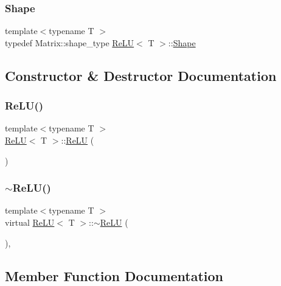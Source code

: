 \subsubsection{\texorpdfstring{Shape}{Shape}}
{\footnotesize\ttfamily template$<$typename T $>$ \\
typedef Matrix\+::shape\+\_\+type \mbox{\hyperlink{class_re_l_u}{Re\+LU}}$<$ T $>$\+::\mbox{\hyperlink{class_re_l_u_ae27e6aba0a09baa85b8ef8679db42719}{Shape}}}



\subsection{Constructor \& Destructor Documentation}
\mbox{\label{class_re_l_u_ad378d979e537b8af65513b3cb9bfe2b1}} 
\subsubsection{\texorpdfstring{ReLU()}{ReLU()}}
{\footnotesize\ttfamily template$<$typename T $>$ \\
\mbox{\hyperlink{class_re_l_u}{Re\+LU}}$<$ T $>$\+::\mbox{\hyperlink{class_re_l_u}{Re\+LU}} (\begin{DoxyParamCaption}{ }\end{DoxyParamCaption})}

\mbox{\label{class_re_l_u_a6694b0386daea4398ad932f92382e206}} 
\subsubsection{\texorpdfstring{$\sim$ReLU()}{~ReLU()}}
{\footnotesize\ttfamily template$<$typename T $>$ \\
virtual \mbox{\hyperlink{class_re_l_u}{Re\+LU}}$<$ T $>$\+::$\sim$\mbox{\hyperlink{class_re_l_u}{Re\+LU}} (\begin{DoxyParamCaption}{ }\end{DoxyParamCaption})\hspace{0.3cm}{\ttfamily [virtual]}, {\ttfamily [default]}}



\subsection{Member Function Documentation}
\mbox{\label{class_re_l_u_aa634f43909614b979d84f5d4e5480bb4}} 
